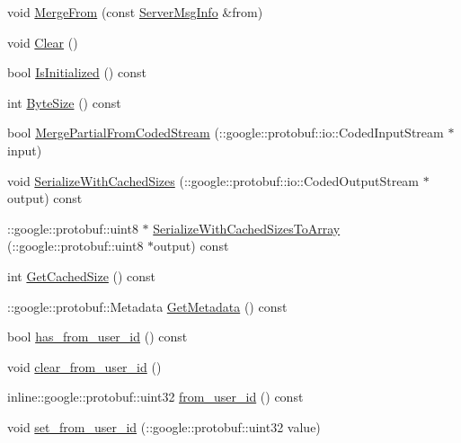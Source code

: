 \begin{DoxyCompactItemize}
\item 
void \hyperlink{class_i_m_1_1_base_define_1_1_server_msg_info_a9c31f5c48d4aacc055768a080c0c6c6d}{Merge\+From} (const \hyperlink{class_i_m_1_1_base_define_1_1_server_msg_info}{Server\+Msg\+Info} \&from)
\item 
void \hyperlink{class_i_m_1_1_base_define_1_1_server_msg_info_a0596dc036158682544ebbdbdeed44578}{Clear} ()
\item 
bool \hyperlink{class_i_m_1_1_base_define_1_1_server_msg_info_ac86633e5ef467a0bd8c4bd9e0e75e03b}{Is\+Initialized} () const 
\item 
int \hyperlink{class_i_m_1_1_base_define_1_1_server_msg_info_a5c9a68ad8bd799ed68dc1fc8c8bafb36}{Byte\+Size} () const 
\item 
bool \hyperlink{class_i_m_1_1_base_define_1_1_server_msg_info_a698f1755ee9854407cc8853d12cb8581}{Merge\+Partial\+From\+Coded\+Stream} (\+::google\+::protobuf\+::io\+::\+Coded\+Input\+Stream $\ast$input)
\item 
void \hyperlink{class_i_m_1_1_base_define_1_1_server_msg_info_a0b9ab09ead7771485a58a9b68f7a29eb}{Serialize\+With\+Cached\+Sizes} (\+::google\+::protobuf\+::io\+::\+Coded\+Output\+Stream $\ast$output) const 
\item 
\+::google\+::protobuf\+::uint8 $\ast$ \hyperlink{class_i_m_1_1_base_define_1_1_server_msg_info_ac597a7f6b147a8131f6020d38928415d}{Serialize\+With\+Cached\+Sizes\+To\+Array} (\+::google\+::protobuf\+::uint8 $\ast$output) const 
\item 
int \hyperlink{class_i_m_1_1_base_define_1_1_server_msg_info_a7cd3f74a2842f95d2610043972fdc723}{Get\+Cached\+Size} () const 
\item 
\+::google\+::protobuf\+::\+Metadata \hyperlink{class_i_m_1_1_base_define_1_1_server_msg_info_a7c6e37b8e8b252f32f588870aab64bdc}{Get\+Metadata} () const 
\item 
bool \hyperlink{class_i_m_1_1_base_define_1_1_server_msg_info_a182d90b61fe508497148aea6b898f1d5}{has\+\_\+from\+\_\+user\+\_\+id} () const 
\item 
void \hyperlink{class_i_m_1_1_base_define_1_1_server_msg_info_a92efd38d3b0b5db8c57430fae0e6dda5}{clear\+\_\+from\+\_\+user\+\_\+id} ()
\item 
inline\+::google\+::protobuf\+::uint32 \hyperlink{class_i_m_1_1_base_define_1_1_server_msg_info_a73562e39df7fdb66ae0d7b61a0fe84ea}{from\+\_\+user\+\_\+id} () const 
\item 
void \hyperlink{class_i_m_1_1_base_define_1_1_server_msg_info_a9c080672b749adb97761428f6f55d0fe}{set\+\_\+from\+\_\+user\+\_\+id} (\+::google\+::protobuf\+::uint32 value)

\end{DoxyCompactItemize}
